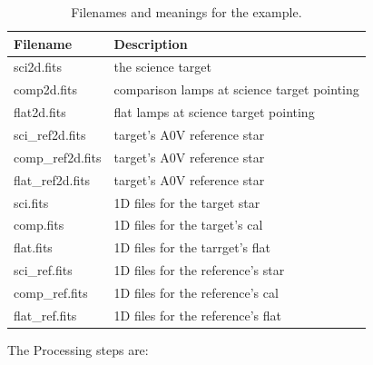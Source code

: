 \begin{table}[h!]
\centering
\begin{tabular}{| l | l |}
\hline
Filename          &  Description                                   \\ 
\hline
sci2d.fits        &  the science target                            \\ 
comp2d.fits       &  comparison lamps at science target pointing   \\ 
flat2d.fits       &  flat lamps at science target pointing    \\ 
sci\_ref2d.fits   &  target's A0V reference star                   \\ 
comp\_ref2d.fits  &  target's A0V reference star                   \\ 
flat\_ref2d.fits  &  target's A0V reference star                   \\ 
sci.fits          &  1D files for the target star                  \\ 
comp.fits         &  1D files for the target's cal                 \\ 
flat.fits         &  1D files for the tarrget's flat               \\ 
sci\_ref.fits     &  1D files for the reference's star             \\ 
comp\_ref.fits    &  1D files for the reference's cal              \\ 
flat\_ref.fits    &  1D files for the reference's flat             \\ 
\hline
\end{tabular}
\caption[TOC]{Filenames and meanings for the example.}
\label{table:Filenamesandmeaningsfortheexample.}
\end{table}

The Processing steps are:

